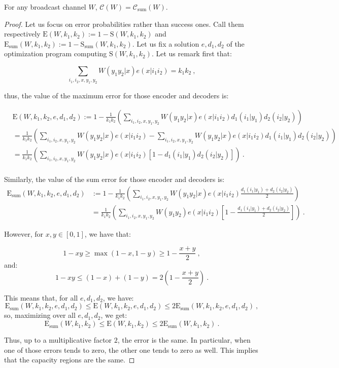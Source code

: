 \begin{prop}
  \label{prop:capacitysum}
  For any broadcast channel $W$, $\mathcal{C}(W) = \mathcal{C}_{\text{sum}}(W)$.
\end{prop}
\begin{proof}
  Let us focus on error probabilities rather than success ones. Call them respectively $\mathrm{E}(W,k_1,k_2) := 1-\mathrm{S}(W,k_1,k_2)$ and $\mathrm{E}_{\text{sum}}(W,k_1,k_2) := 1-\mathrm{S}_{\text{sum}}(W,k_1,k_2)$. Let us fix a solution $e,d_1,d_2$ of the optimization program computing $\mathrm{S}(W,k_1,k_2)$. Let us remark first that:

  \[ \sum_{i_1,i_2,x,y_1,y_2} W(y_1y_2|x)e(x|i_1i_2) = k_1k_2\ , \]

  thus, the value of the maximum error for those encoder and decoders is:

\begin{equation}
  \begin{aligned}
    &\mathrm{E}(W,k_1,k_2,e,d_1,d_2) := 1 -  \frac{1}{k_1k_2}\left(\sum_{i_1,i_2,x,y_1,y_2} W(y_1y_2|x)e(x|i_1i_2)d_1(i_1|y_1)d_2(i_2|y_2)\right)\\
    &=\frac{1}{k_1k_2}\left(\sum_{i_1,i_2,x,y_1,y_2} W(y_1y_2|x)e(x|i_1i_2)-\sum_{i_1,i_2,x,y_1,y_2} W(y_1y_2|x)e(x|i_1i_2)d_1(i_1|y_1)d_2(i_2|y_2)\right)\\
    &=\frac{1}{k_1k_2}\left(\sum_{i_1,i_2,x,y_1,y_2} W(y_1y_2|x)e(x|i_1i_2)\left[1-d_1(i_1|y_1)d_2(i_2|y_2)\right]\right) \ .\\
  \end{aligned}
\end{equation}

Similarly, the value of the sum error for those encoder and decoders is:
\begin{equation}
  \begin{aligned}
    \mathrm{E}_{\text{sum}}(W,k_1,k_2,e,d_1,d_2) &:= 1 -  \frac{1}{k_1k_2}\left(\sum_{i_1,i_2,x,y_1,y_2} W(y_1y_2|x)e(x|i_1i_2)\frac{d_1(i_1|y_1)+d_2(i_2|y_2)}{2}\right)\\
    &= \frac{1}{k_1k_2}\left(\sum_{i_1,i_2,x,y_1,y_2} W(y_1y_2)e(x|i_1i_2)\left[1-\frac{d_1(i_1|y_1)+d_2(i_2|y_2)}{2}\right]\right) \ .
  \end{aligned}
\end{equation}

However, for $x,y \in [0,1]$, we have that:

\[1-xy \geq \max\left(1-x,1-y\right) \geq 1-\frac{x+y}{2} \ , \]
and:
\[1-xy \leq (1-x) + (1-y) = 2  \left(1-\frac{x+y}{2}\right) \ . \]

This means that, for all $e,d_1,d_2$, we have:
\[ \mathrm{E}_{\text{sum}}(W,k_1,k_2,e,d_1,d_2) \leq \mathrm{E}(W,k_1,k_2,e,d_1,d_2) \leq 2\mathrm{E}_{\text{sum}}(W,k_1,k_2,e,d_1,d_2) \ ,\]
so, maximizing over all $e,d_1,d_2$, we get:
\[ \mathrm{E}_{\text{sum}}(W,k_1,k_2) \leq \mathrm{E}(W,k_1,k_2) \leq 2\mathrm{E}_{\text{sum}}(W,k_1,k_2) \ .\]

Thus, up to a multiplicative factor $2$, the error is the same. In particular, when one of those errors tends to zero, the other one tends to zero as well. This implies that the capacity regions are the same.
\end{proof}

